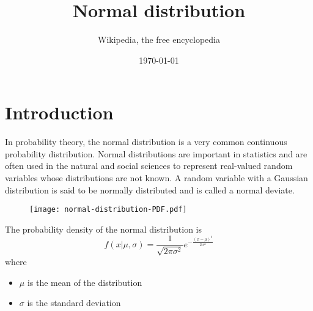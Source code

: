 \documentclass[12pt,a4paper]{article}
\title{Normal distribution}
\author{Wikipedia, the free encyclopedia}
\date{\today}
\begin{document}
\maketitle
\section{Introduction}
In probability theory, the normal distribution is a very common continuous probability
distribution. Normal distributions are important in statistics and are often used in the natural
and social sciences to represent real-valued random variables whose distributions are not known.
A random variable with a Gaussian distribution is said to be normally distributed and is called a
normal deviate.

\begin{figure}[h]
  \centering
  \texttt{[image: normal-distribution-PDF.pdf]}
\end{figure}

The probability density of the normal distribution is
\begin{equation}
  f(x|\mu,\sigma)
  = \frac{1}{\sqrt{2\pi\sigma^2}}
    e^{-\frac{(x-\mu)^2}{2\sigma^2}}
\end{equation}
where
\begin{itemize}
  \item $\mu$ is the mean of the distribution
  \item $\sigma$ is the standard deviation
\end{itemize}
\end{document}

